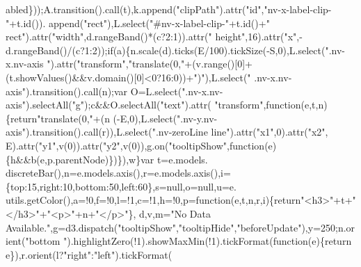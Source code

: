\begin{DoxyCode}
      abled\}));A.transition().call(t),k.append(\textcolor{stringliteral}{"clipPath"}).attr(\textcolor{stringliteral}{"id"},\textcolor{stringliteral}{"nv-x-label-clip-"}+t.id()).
      append(\textcolor{stringliteral}{"rect"}),L.select(\textcolor{stringliteral}{"#nv-x-label-clip-"}+t.id()+\textcolor{stringliteral}{" rect"}).attr(\textcolor{stringliteral}{"width"},d.rangeBand()*(c?2:1)).attr(\textcolor{stringliteral}{"
      height"},16).attr(\textcolor{stringliteral}{"x"},-d.rangeBand()/(c?1:2));\textcolor{keywordflow}{if}(a)\{n.scale(d).ticks(E/100).tickSize(-S,0),L.select(\textcolor{stringliteral}{".nv-x.nv-axis
      "}).attr(\textcolor{stringliteral}{"transform"},\textcolor{stringliteral}{"translate(0,"}+(v.range()[0]+(t.showValues()&&v.domain()[0]<0?16:0))+\textcolor{stringliteral}{")"}),L.select(\textcolor{stringliteral}{"
      .nv-x.nv-axis"}).transition().call(n);var O=L.select(\textcolor{stringliteral}{".nv-x.nv-axis"}).selectAll(\textcolor{stringliteral}{"g"});c&&O.selectAll(\textcolor{stringliteral}{"text"}).attr(\textcolor{stringliteral}{
      "transform"},\textcolor{keyword}{function}(e,t,n)\{\textcolor{keywordflow}{return}\textcolor{stringliteral}{"translate(0,"}+(n%
      (-E,0),L.select(\textcolor{stringliteral}{".nv-y.nv-axis"}).transition().call(r)),L.select(\textcolor{stringliteral}{".nv-zeroLine line"}).attr(\textcolor{stringliteral}{"x1"},0).attr(\textcolor{stringliteral}{"x2"},
      E).attr(\textcolor{stringliteral}{"y1"},v(0)).attr(\textcolor{stringliteral}{"y2"},v(0)),g.on(\textcolor{stringliteral}{"tooltipShow"},\textcolor{keyword}{function}(e)\{h&&b(e,p.parentNode)\})\}),w\}var t=e.models.
      discreteBar(),n=e.models.axis(),r=e.models.axis(),i=\{top:15,right:10,bottom:50,left:60\},s=null,o=null,u=e.
      utils.getColor(),a=!0,f=!0,l=!1,c=!1,h=!0,p=\textcolor{keyword}{function}(e,t,n,r,i)\{\textcolor{keywordflow}{return}\textcolor{stringliteral}{"<h3>"}+t+\textcolor{stringliteral}{"</h3>"}+\textcolor{stringliteral}{"<p>"}+n+\textcolor{stringliteral}{"</p>"}\},
      d,v,m=\textcolor{stringliteral}{"No Data Available."},g=d3.dispatch(\textcolor{stringliteral}{"tooltipShow"},\textcolor{stringliteral}{"tooltipHide"},\textcolor{stringliteral}{"beforeUpdate"}),y=250;n.orient(\textcolor{stringliteral}{"bottom
      "}).highlightZero(!1).showMaxMin(!1).tickFormat(\textcolor{keyword}{function}(e)\{\textcolor{keywordflow}{return} e\}),r.orient(l?\textcolor{stringliteral}{"right"}:\textcolor{stringliteral}{"left"}).tickFormat(

\end{DoxyCode}
